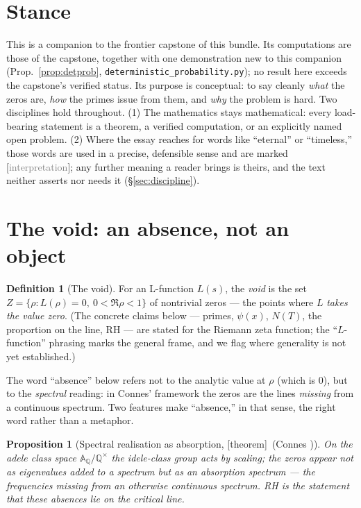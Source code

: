 \documentclass[11pt,a4paper]{article}
\newtheorem{proposition}[theorem]{Proposition}
\theoremstyle{definition}
\newtheorem{definition}[theorem]{Definition}
\newcommand{\Q}{\mathbb{Q}}
\newcommand{\A}{\mathbb{A}}
\newcommand{\TAGthm}{{\small\textsf{[\textcolor{green!45!black}{theorem}]}}}
\newcommand{\TAGphil}{{\small\textsf{[\textcolor{gray}{interpretation}]}}}
\begin{document}
\tableofcontents

\section{Stance}\label{sec:stance}
This is a companion to the frontier capstone of this bundle. Its computations
are those of the capstone, together with one demonstration new to this
companion (Prop.\ \ref{prop:detprob}, \texttt{deterministic\_probability.py});
no result here exceeds the capstone's verified status. Its purpose is
conceptual: to say cleanly \emph{what} the zeros are, \emph{how} the primes
issue from them, and \emph{why} the problem is hard. Two disciplines hold
throughout. (1) The mathematics stays mathematical: every load-bearing
statement is a theorem, a verified computation, or an explicitly named open
problem. (2) Where the essay reaches for words like ``eternal'' or
``timeless,'' those words are used in a precise, defensible sense and are
marked \TAGphil; any further meaning a reader brings is theirs, and the text
neither asserts nor needs it (\S\ref{sec:discipline}).

\section{The void: an absence, not an object}\label{sec:void}

\begin{definition}[The void]\label{def:void}
For an L-function $L(s)$, the \emph{void} is the set
$Z=\{\rho : L(\rho)=0,\ 0<\Re\rho<1\}$ of nontrivial zeros --- the points where
$L$ \emph{takes the value zero}. (The concrete claims below --- primes,
$\psi(x)$, $N(T)$, the proportion on the line, RH --- are stated for the
Riemann zeta function; the ``$L$-function'' phrasing marks the general frame,
and we flag where generality is not yet established.)
\end{definition}

The word ``absence'' below refers not to the analytic value at $\rho$ (which is
$0$), but to the \emph{spectral} reading: in Connes' framework the zeros are
the lines \emph{missing} from a continuous spectrum. Two features make
``absence,'' in that sense, the right word rather than a metaphor.

\begin{proposition}[Spectral realisation as absorption, \TAGthm\ (Connes
\cite{Connes})]\label{prop:absorption}
On the adele class space $\A_\Q/\Q^\times$ the idele-class group acts by
scaling; the zeros appear not as eigenvalues added to a spectrum but as an
\emph{absorption spectrum} --- the frequencies \emph{missing} from an otherwise
continuous spectrum. RH is the statement that these absences lie on the
critical line.
\end{proposition}
\end{document}
